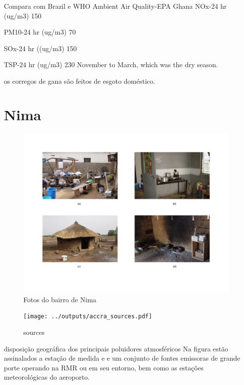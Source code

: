 Compara com Brazil e WHO
Ambient Air Quality-EPA Ghana
NOx-24 hr (ug/m3) 150

PM10-24 hr (ug/m3) 70

SOx-24 hr ((ug/m3) 150

TSP-24 hr (ug/m3) 230
 November to March, which was the dry season.


os corregos de gana são feitos de  esgoto doméstico.


\section{Nima}

\begin{figure}[H]
  \caption{Fotos do bairro de Nima}
  \includegraphics[scale=0.35]{../inputs/images/zheng/nima.pdf}
\end{figure}


\begin{figure}[H]
\begin{center}
  \texttt{[image: ../outputs/accra\_sources.pdf]}
  \caption{sources}
\end{center}
\end{figure}

disposição geográfica dos principais poluidores atmosféricos
Na figura estão assinalados a estação de medida e e um conjunto de fontes emissoras 
de grande porte operando na RMR ou em seu entorno, bem como as estações 
meteorológicas do aeroporto.


